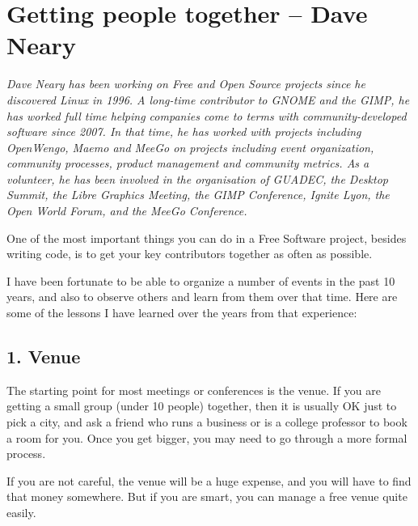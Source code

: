 \chapter{Getting people together -- Dave Neary }

\textit{Dave Neary has been working on Free and Open Source projects since he
discovered Linux in 1996. A long-time contributor to GNOME and the GIMP,
he has worked full time helping companies come to terms with
community-developed software since 2007. In that time, he has worked
with projects including OpenWengo, Maemo and MeeGo on projects including
event organization, community processes, product management and
community metrics. As a volunteer, he has been involved in the
organisation of GUADEC, the Desktop Summit, the Libre Graphics Meeting,
the GIMP Conference, Ignite Lyon, the Open World Forum, and the MeeGo
Conference.
}

One of the most important things you can do in a Free Software project,
besides writing code, is to get your key contributors together as often
as possible.

I have been fortunate to be able to organize a number of events in the
past 10 years, and also to observe others and learn from them over that
time. Here are some of the lessons I have learned over the years from that
experience:

\section*{1. Venue}

The starting point for most meetings or conferences is the venue. If
you are getting a small group (under 10 people) together, then it is
usually OK just to pick a city, and ask a friend who runs a business or
is a college professor to book a room for you. Once you get bigger, you
may need to go through a more formal process.

If you are not careful, the venue will be a huge expense, and you will have
to find that money somewhere. But if you are smart, you can manage a
free venue quite easily.

